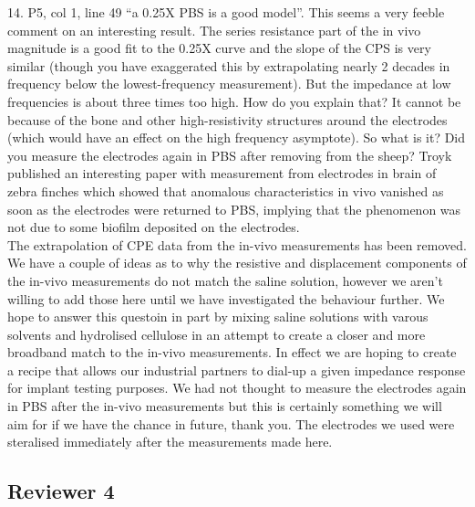 \documentclass[journal, a4paper]{IEEEtran}
\begin{document}
{14. P5, col 1, line 49 ``a 0.25X PBS is a good model''.  This seems a very feeble comment on an interesting result. The series resistance part of the in vivo magnitude is a good fit to the 0.25X curve and the slope of the CPS is very similar (though you have exaggerated this by extrapolating nearly 2 decades in frequency below the lowest-frequency measurement). But the impedance at low frequencies is about three times too high. How do you explain that? It cannot be because of the bone and other high-resistivity structures around the electrodes (which would have an effect on the high frequency asymptote). So what is it? Did you measure the electrodes again in PBS after removing from the sheep? Troyk published an interesting paper with measurement from electrodes in brain of zebra finches which showed that anomalous characteristics in vivo vanished as soon as the electrodes were returned to PBS, implying that the phenomenon was not due to some biofilm deposited on the electrodes.\\
{\color{OliveGreen} The extrapolation of CPE data from the in-vivo measurements has been removed. We have a couple of ideas as to why the resistive and displacement components of the in-vivo measurements do not match the saline solution, however we aren't willing to add those here until we have investigated the behaviour further. We hope to answer this questoin in part by mixing saline solutions with varous solvents and hydrolised cellulose in an attempt to create a closer and more broadband match to the in-vivo measurements. In effect we are hoping to create a recipe that allows our industrial partners to dial-up a given impedance response for implant testing purposes. We had not thought to measure the electrodes again in PBS after the in-vivo measurements but this is certainly something we will aim for if we have the chance in future, thank you. The electrodes we used were steralised immediately after the measurements made here.}\\
}




\subsection*{Reviewer 4}
\end{document}
